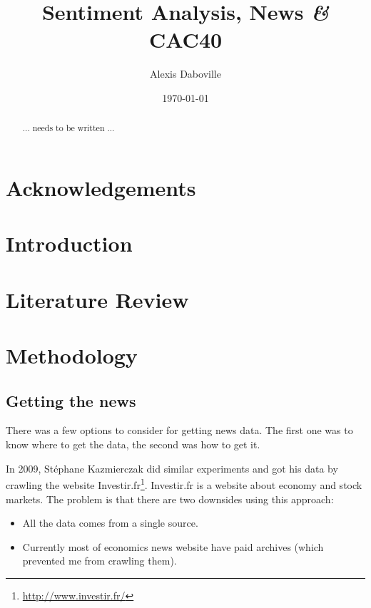 \documentclass[12pt]{report}
\newcommand{\amp}{{\fontfamily{ppl}\selectfont\emph\&}}
\begin{document}
	\title{Sentiment Analysis, News \amp{} CAC40}
	\date{\today}
	\author{Alexis Daboville}
	
	\maketitle
	
	\begin{abstract}
		... needs to be written ...
	\end{abstract}
	
	\pagestyle{headings}
	\tableofcontents
	\listoffigures
	\listoftables
	
	\newpage
	
	\chapter*{Acknowledgements}
	
	\chapter{Introduction}
	
	\chapter{Literature Review}
	
	\chapter{Methodology}
		\section{Getting the news}
		
			There was a few options to consider for getting news data. The first one was to know where to get the data, the second was how to get it.
			
			In 2009, Stéphane Kazmierczak did similar experiments and got his data by crawling the website Investir.fr\footnote{\url{http://www.investir.fr/}}. Investir.fr is a website about economy and stock markets. The problem is that there are two downsides using this approach:
			\begin{itemize}
				\item All the data comes from a single source.
				\item Currently most of economics news website have paid archives (which prevented me from crawling them).
			\end{itemize}
			
\end{document}
